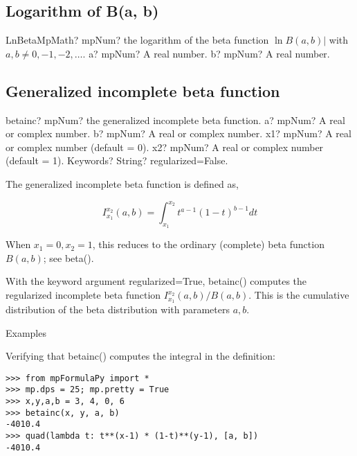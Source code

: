 \subsection{Logarithm of  B(a, b)}

\begin{mpFunctionsExtract}
	\mpFunctionTwoNotImplemented
	{LnBetaMpMath? mpNum? the logarithm of the beta function $\ln B(a,b)|$ with $a,b \neq 0,-1,-2,\ldots$.}
	{a? mpNum? A real number.}
	{b? mpNum? A real number.}
\end{mpFunctionsExtract}



\subsection{Generalized incomplete beta function}

\begin{mpFunctionsExtract}
	\mpFunctionFive
	{betainc? mpNum? the generalized incomplete beta function.}
	{a? mpNum? A real or complex number.}
	{b? mpNum? A real or complex number.}
	{x1? mpNum? A real or complex number (default = 0).}
	{x2? mpNum? A real or complex number (default = 1).}	
	{Keywords? String?  regularized=False.}	
\end{mpFunctionsExtract}

\vpara
The generalized incomplete beta function is defined as, 

\begin{equation}
	I_{x_1}^{x_2}(a,b)=\int_{x_1}^{x_2} t^{a-1}(1-t)^{b-1} dt
\end{equation}



When $x_1=0, x_2=1$, this reduces to the ordinary (complete) beta function $B(a,b)$; see beta().

\vpara
With the keyword argument regularized=True, betainc() computes the
regularized incomplete beta function $I_{x_1}^{x_2}(a,b)/B(a, b)$. This is the cumulative distribution of the beta distribution with parameters $a, b$.

\vpara
Examples

Verifying that betainc() computes the integral in the definition:

\begin{lstlisting}
>>> from mpFormulaPy import *
>>> mp.dps = 25; mp.pretty = True
>>> x,y,a,b = 3, 4, 0, 6
>>> betainc(x, y, a, b)
-4010.4
>>> quad(lambda t: t**(x-1) * (1-t)**(y-1), [a, b])
-4010.4
\end{lstlisting}

